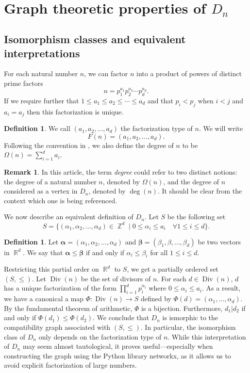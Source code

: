 \documentclass[11pt,a4paper]{amsart}
\theoremstyle{definition}
\newtheorem{definition}[thm]{Definition}
\newtheorem{rem}[thm]{Remark}
\DeclareMathOperator{\R}{\mathbb{R}}
\DeclareMathOperator{\Z}{\mathbb{Z}}
\DeclareMathOperator{\Div}{\text{Div}}
\numberwithin{equation}{section}
\begin{document}
\section{Graph theoretic properties of $D_n$} 
\label{sec:graph theoretic}

\subsection{Isomorphism classes and equivalent interpretations}
\label{subsec:equivalent}

For each natural number $n$, we can factor $n$ into a product of powers of distinct prime factors 
\[ n = p_1^{a_1} p_2^{a_2} \cdots p_d^{a_d}. \] 
If we require further that $1 \leq a_1 \leq a_2 \leq  \cdots \leq a_d$ and that $p_i<p_j$ when $i<j$ and $a_i=a_j$ then this factorization is unique. 
\begin{definition}
    We call $(a_1, a_2, \ldots, a_d)$ the factorization type of $n.$ We will write 
    \[ F(n)= (a_1, a_2, \ldots, a_d). \]
Following the convention in \cite{divisor_numbers}, we also define the degree of $n$ to be $\Omega(n)= \sum_{i=1}^d a_i.$
\end{definition}
\begin{rem}
In this article, the term \textit{degree} could refer to two distinct notions: the degree of a natural number $n$, denoted by $\Omega(n)$, and the degree of $n$ considered as a vertex in $D_n$, denoted by $\deg(n)$. It should be clear from the context which one is being referenced.


\end{rem}

We now describe an equivalent definition of $D_n.$ Let $S$ be the following set 
\[ S =\{ (\alpha_1, \alpha_2, \ldots, \alpha_d) \in \Z^d \mid 0 \leq \alpha_i \leq a_i \quad \forall 1 \leq i \leq d \}.\]

\begin{definition}
Let $ \bm{\alpha} = (\alpha_1, \alpha_2, \ldots, \alpha_d)$ and $ \bm{\beta} = (\beta_1, \beta, \ldots, \beta_d)$ be two vectors in $\R^{d}.$ We say that $\bm{\alpha} \leq \bm{\beta}$ if and only if $\alpha_i \leq \beta_i$ for all $1 \leq i \leq d.$ 
\end{definition}
Restricting this partial order on $\R^{d}$ to $S$, we get a partially ordered set $(S,\le)$.  Let $\Div(n)$ be the set of divisors of $n.$ For each $d \in \Div(n)$, $d$ has a unique factorization of the form $\prod_{i=1}^d p_i^{\alpha_i}$ where $0 \leq \alpha_i \leq a_i.$ As a result, we have a canonical a map $\Phi\colon \Div(n) \to S$  defined by $\Phi(d)=(\alpha_1, \ldots, \alpha_d).$ By the fundamental theorem of arithmetic, $\Phi$ is a bijection. Furthermore, $d_1 | d_2$ if and only if $\Phi(d_1) \leq \Phi(d_2).$ We conclude that $D_n$ is ismorphic to the compatibility graph associated with $(S, \leq).$ In particular, the isomorphism class of $D_n$ only depends on the factorization type of $n.$  While this interpretation of $D_n$ may seem almost tautological, it proves useful—especially when constructing the graph using the Python library networkx, as it allows us to avoid explicit factorization of large numbers.
\end{document}
